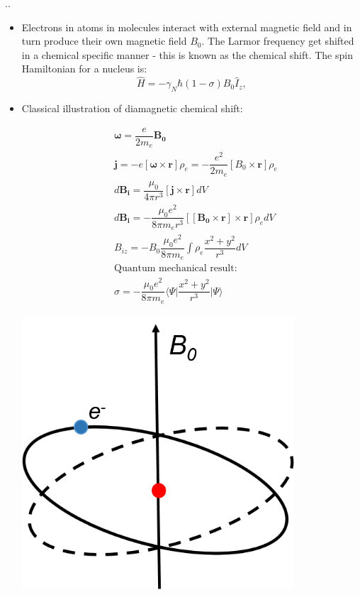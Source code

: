 \documentclass{beamer}
\begin{document}
\begin{frame}{\thesection.\thesubsection. \insertsubsection}
	\begin{itemize}[<+>]
		\item 
			Electrons in atoms in molecules interact with external magnetic field and in turn produce their own magnetic field $B_0$. The Larmor frequency get shifted in a chemical specific manner - this is known as the \alert{chemical shift}.  The spin Hamiltonian for a nucleus is:
		\begin{equation}
			\hat{H} = -\gamma_N \hbar (1 - \sigma) B_0 \hat{I}_z,
		\end{equation}
	
		
		\item Classical illustration of diamagnetic chemical shift:	
			
				\begin{minipage}{0.4\textwidth}
					{\tiny
					\begin{align*}
					&\bm{\omega} = \dfrac{e}{2 m_e} \bm{B_0} \\
					&\bm{j} = -e[\bm{\omega} \times \bm{r}] \rho_e = -\dfrac{e^2}{2m_e}[B_0 \times \bm{r}] \rho_e \\				
					&d \bm{B_i} =  \dfrac{\mu_0}{4 \pi r^3}[\bm{j} \times \bm{r}] dV	\\
					&d \bm{B_i} = - \dfrac{\mu_0 e^2}{8 \pi m_e r^3}[[\bm{B_0} \times \bm{r}] \times \bm{r}] \rho_e dV	\\
					& B_{iz}  = - B_0 \dfrac{\mu_0 e^2}{8 \pi m_e} \int \rho_e \dfrac{x^2 + y^2}{r^3}  dV \\ 	
					&\text{Quantum mechanical result:}  \\
					&\sigma = - \dfrac{\mu_0 e^2}{8 \pi m_e} \langle \Psi \vert \dfrac{x^2 + y^2}{r^3} \vert \Psi \rangle 
					\end{align*}
				    }%
				\end{minipage}
				\hspace{0.1 cm}
				\begin{minipage}{0.45\textwidth}
					\includegraphics[width = 0.8\textwidth]{diamagnetic_term.png}
				\end{minipage}
			
	\end{itemize}
\end{frame}
\end{document}
